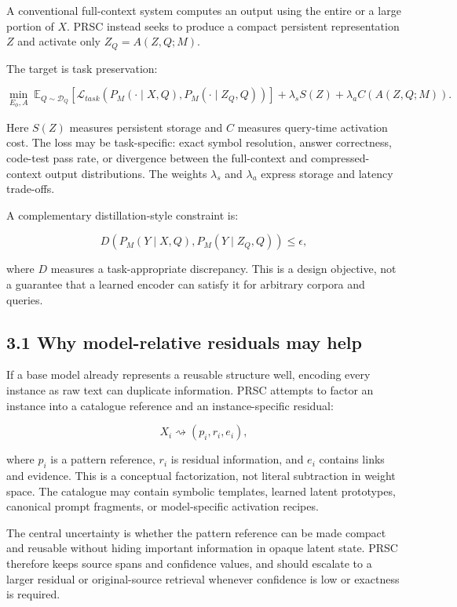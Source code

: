 \documentclass[
  10pt,
]{article}
\begin{document}
A conventional full-context system computes an output using the entire
or a large portion of \(X\). PRSC instead seeks to produce a compact
persistent representation \(Z\) and activate only \(Z_Q=A(Z,Q;M)\).

The target is task preservation:

\[
\min_{E_\phi,A} \; \mathbb{E}_{Q\sim\mathcal{D}_Q}
\left[\mathcal{L}_{task}\left(P_M(\cdot\mid X,Q),P_M(\cdot\mid Z_Q,Q)\right)\right]
+ \lambda_s S(Z) + \lambda_a C(A(Z,Q;M)).
\]

Here \(S(Z)\) measures persistent storage and \(C\) measures query-time
activation cost. The loss may be task-specific: exact symbol resolution,
answer correctness, code-test pass rate, or divergence between the
full-context and compressed-context output distributions. The weights
\(\lambda_s\) and \(\lambda_a\) express storage and latency trade-offs.

A complementary distillation-style constraint is:

\[
D\left(P_M(Y\mid X,Q),P_M(Y\mid Z_Q,Q)\right)\leq\epsilon,
\]

where \(D\) measures a task-appropriate discrepancy. This is a design
objective, not a guarantee that a learned encoder can satisfy it for
arbitrary corpora and queries.

\subsection{3.1 Why model-relative residuals may
help}\label{why-model-relative-residuals-may-help}

If a base model already represents a reusable structure well, encoding
every instance as raw text can duplicate information. PRSC attempts to
factor an instance into a catalogue reference and an instance-specific
residual:

\[
X_i \rightsquigarrow (p_i, r_i, e_i),
\]

where \(p_i\) is a pattern reference, \(r_i\) is residual information,
and \(e_i\) contains links and evidence. This is a conceptual
factorization, not literal subtraction in weight space. The catalogue
may contain symbolic templates, learned latent prototypes, canonical
prompt fragments, or model-specific activation recipes.

The central uncertainty is whether the pattern reference can be made
compact and reusable without hiding important information in opaque
latent state. PRSC therefore keeps source spans and confidence values,
and should escalate to a larger residual or original-source retrieval
whenever confidence is low or exactness is required.
\end{document}
